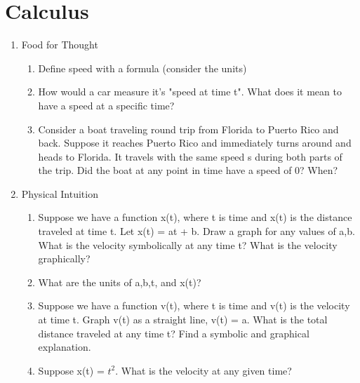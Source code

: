 \documentclass{article}
\begin{document}
\section{Calculus}
\label{sec:Calculus}
\begin{enumerate}
    \item Food for Thought
    \begin{enumerate}
        \item Define speed with a formula (consider the units)
        \item How would a car measure it's "speed at time t". What does it mean to have a speed at a specific time?
        \item Consider a boat traveling round trip from Florida to Puerto Rico and back. Suppose it reaches Puerto Rico and immediately turns around and heads to Florida. It travels with the same speed s during both parts of the trip. Did the boat at any point in time have a speed of 0? When?
    \end{enumerate}

    \item Physical Intuition
    \begin{enumerate}
        \item Suppose we have a function x(t), where t is time and x(t) is the distance traveled at time t. Let x(t) = at + b. Draw a graph for any values of a,b. What is the velocity symbolically at any time t? What is the velocity graphically?
        \item What are the units of a,b,t, and x(t)?
        \item Suppose we have a function v(t), where t is time and v(t) is the velocity at time t. Graph v(t) as a straight line, v(t) = a. What is the total distance traveled at any time t? Find a symbolic and graphical explanation.
        \item Suppose x(t) = $t^2$. What is the velocity at any given time?
    \end{enumerate}
    

\end{enumerate}
\end{document}
